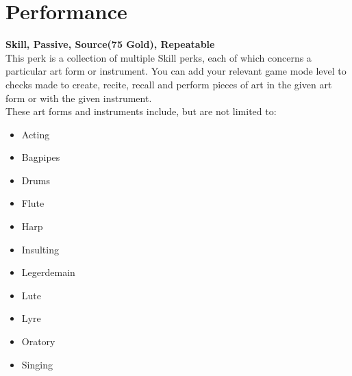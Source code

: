 \section{Performance}\label{sec:performance}
\textbf{Skill, Passive, Source(75 Gold), Repeatable}\\
This perk is a collection of multiple Skill perks, each of which concerns a particular art form or instrument.
You can add your relevant game mode level to checks made to create, recite, recall and perform pieces of art in the given art form or with the given instrument.\\
These art forms and instruments include, but are not limited to:\\

\begin{itemize}
    \item Acting
    \item Bagpipes
    \item Drums
    \item Flute
    \item Harp
    \item Insulting
    \item Legerdemain
    \item Lute
    \item Lyre
    \item Oratory
    \item Singing
\end{itemize}